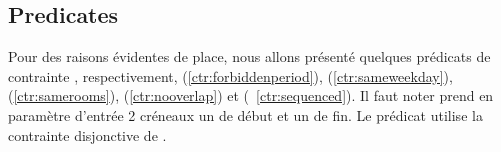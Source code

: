\subsection{{\UTP} Predicates}
\label{sec:model-predicates}


Pour des raisons évidentes de place, nous allons présenté quelques  prédicats de contrainte \UTP{} , respectivement,
\texttt{\FORBIDDENPERIOD} (\ref{ctr:forbiddenperiod}),
\texttt{\SAMEWEEKDAY} (\ref{ctr:sameweekday}), 
\texttt{\SAMEROOMS} (\ref{ctr:samerooms}),
\texttt{\NOOVERLAP} (\ref{ctr:nooverlap}) 
et \texttt{\SEQUENCED} (~\ref{ctr:sequenced}).
Il faut noter \texttt{\FORBIDDENPERIOD} prend en paramètre d'entrée 2 créneaux un de début et un de fin. 
Le prédicat \texttt{\NOOVERLAP} utilise la contrainte disjonctive de \MINIZINC{}.






